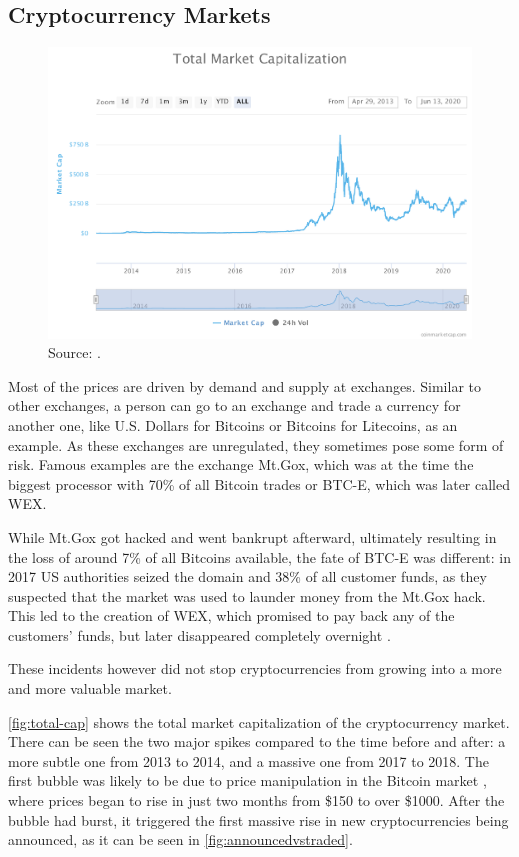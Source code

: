 \documentclass[11pt,a4paper,compsoc,conference]{IEEEtran}
\begin{document}
\subsection{Cryptocurrency Markets} 
\begin{figure}
    \centering
    \includegraphics[width=\linewidth]{figures/total-market-capitalizat.pdf}
    \caption[Cryptocurrency Market Capitalization]{Source: \citep{coinmarketcap}. }
    \label{fig:total-cap}
\end{figure}

Most of the prices are driven by demand and supply at exchanges. Similar to other exchanges, a person can go to an exchange and trade a currency for another one, like U.S. Dollars for Bitcoins or Bitcoins for Litecoins, as an example. As these exchanges are unregulated, they sometimes pose some form of risk. Famous examples are the exchange Mt.Gox, which was at the time the biggest processor with 70\% of all Bitcoin trades \citep{wsj} or BTC-E, which was later called WEX. 

While Mt.Gox got hacked and went bankrupt afterward, ultimately resulting in the loss of around 7\% of all Bitcoins available, the fate of BTC-E was different: in 2017 US authorities seized the domain and 38\% of all customer funds, as they suspected that the market was used to launder money from the Mt.Gox hack. This led to the creation of WEX, which promised to pay back any of the customers' funds, but later disappeared completely overnight \citep{wexnzcase}. 

These incidents however did not stop cryptocurrencies from growing into a more and more valuable market.  

\autoref{fig:total-cap} shows the total market capitalization of the cryptocurrency market. There can be seen the two major spikes compared to the time before and after: a more subtle one from 2013 to 2014, and a massive one from 2017 to 2018. The first bubble was likely to be due to price manipulation in the Bitcoin market \citep{article}, where prices began to rise in just two months from \$150  to over \$1000. After the bubble had burst, it triggered the first massive rise in new cryptocurrencies being announced, as it can be seen in \autoref{fig:announcedvstraded}. 
\end{document}
